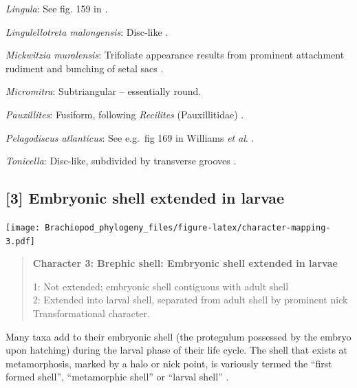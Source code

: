 \documentclass[openany]{book}
\begin{document}
\hypertarget{Lingula-coding-2}{}
\emph{Lingula}: See fig. 159 in \citet{Williams1997Introduction}.

\hypertarget{Lingulellotreta_malongensis-coding-2}{}
\emph{Lingulellotreta malongensis}: Disc-like \citep{Li2004}.

\hypertarget{Mickwitzia_muralensis-coding-2}{}
\emph{Mickwitzia muralensis}: Trifoliate appearance results from
prominent attachment rudiment and bunching of setal sacs
\citep{Balthasar2009Thebrachiopod}.

\hypertarget{Micromitra-coding-2}{}
\emph{Micromitra}: Subtriangular -- essentially round.

\hypertarget{Pauxillites-coding-2}{}
\emph{Pauxillites}: Fusiform, following \emph{Recilites} (Pauxillitidae)
\citep{Dzik1978}.

\hypertarget{Pelagodiscus_atlanticus-coding-2}{}
\emph{Pelagodiscus atlanticus}: See e.g.~fig 169 in Williams \emph{et
al}. \citeyearpar{Williams1997Introduction}.

\hypertarget{Tonicella-coding-2}{}
\emph{Tonicella}: Disc-like, subdivided by transverse grooves
\citep{Wanninger2002C}.

\subsection*{{[}3{]} Embryonic shell extended in
larvae}\label{embryonic-shell-extended-in-larvae}

\texttt{[image: Brachiopod\_phylogeny\_files/figure-latex/character-mapping-3.pdf]}

\begin{quote}
\textbf{Character 3: Brephic shell: Embryonic shell extended in larvae}

1: Not extended; embryonic shell contiguous with adult shell\\
2: Extended into larval shell, separated from adult shell by prominent
nick\\
Transformational character.
\end{quote}

Many taxa add to their embryonic shell (the protegulum possessed by the
embryo upon hatching) during the larval phase of their life cycle. The
shell that exists at metamorphosis, marked by a halo or nick point, is
variously termed the ``first formed shell'', ``metamorphic shell'' or
``larval shell'' \citep{Bassett2017Earliestontogeny}.
\end{document}
